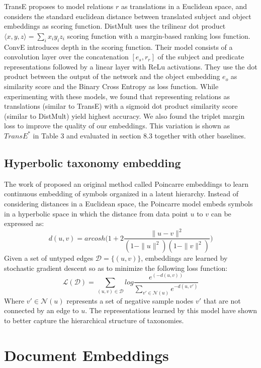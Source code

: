 TransE \cite{bordes2013translating} proposes to model relations $r$ as translations in a Euclidean space, and considers the standard euclidean distance between translated subject and object embeddings as scoring function. DistMult \cite{yang2015embedding} uses the trilinear dot product $\langle x, y, z \rangle = \sum_i x_iy_iz_i$ scoring function with a margin-based ranking loss function. ConvE \cite{dettmers2017convolutional} introduces depth in the scoring function. Their model consists of a convolution layer over the concatenation $ [e_s, r_r ]$ of the subject and predicate representations followed by a linear layer with ReLu activations. They use the dot product between the output of the network and the object embedding $e_o$ as similarity score and the Binary Cross Entropy as loss function. While experimenting with these models, we found that representing relations as translations (similar to TransE) with a sigmoid dot product similarity score (similar to DistMult) yield highest accuracy. We also found the triplet margin loss to improve the quality of our embeddings. This variation is shown as $TransE^{*}$ in Table 3 and evaluated in section 8.3 together with other baselines.
\subsection{Hyperbolic taxonomy embedding}
The work of \cite{nickel2017poincare} proposed an original method called Poincarre embeddings to learn continuous embedding of symbols organized in a latent hierarchy. Instead of considering distances in a Euclidean space, the Poincarre model embeds symbols in a hyperbolic space in which the distance from data point $u$ to $v$ can be expressed as: 
\begin{equation} 
d(u,v)=arcosh\Big( 1 + 2 \dfrac{\|u-v\|^2}{(1 - \|u\|^2)(1 - \|v\|^2)} \Big)
\end{equation} 
Given a set of untyped edges $\mathcal{D} = \{(u,v)\}$, embeddings are learned by stochastic gradient descent so as to minimize the following loss function:
\begin{equation} 
\mathcal{L}(\mathcal{D}) = \sum_{(u,v) \in \mathcal{D}}log\dfrac{e^{(-d(u,v))}}{\sum_{v' \in \mathcal{N}(u)}e^{-d(u,v')}}
\end{equation} 
Where $v' \in \mathcal{N}(u)$ represents a set of negative sample nodes $v'$ that are not connected by an edge to $u$. The representations learned by this model have shown to better capture the hierarchical structure of taxonomies. 
\section{Document Embeddings}

